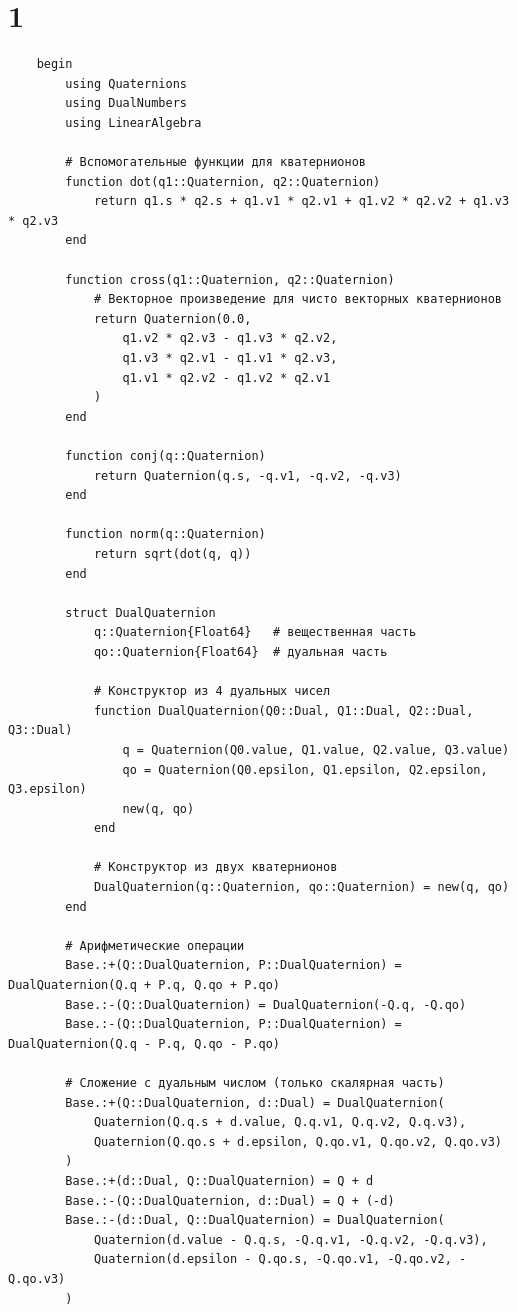\chapter{1}

\begin{verbatim}
    begin
        using Quaternions
        using DualNumbers
        using LinearAlgebra

        # Вспомогательные функции для кватернионов
        function dot(q1::Quaternion, q2::Quaternion)
            return q1.s * q2.s + q1.v1 * q2.v1 + q1.v2 * q2.v2 + q1.v3 * q2.v3
        end

        function cross(q1::Quaternion, q2::Quaternion)
            # Векторное произведение для чисто векторных кватернионов
            return Quaternion(0.0,
                q1.v2 * q2.v3 - q1.v3 * q2.v2,
                q1.v3 * q2.v1 - q1.v1 * q2.v3,
                q1.v1 * q2.v2 - q1.v2 * q2.v1
            )
        end

        function conj(q::Quaternion)
            return Quaternion(q.s, -q.v1, -q.v2, -q.v3)
        end

        function norm(q::Quaternion)
            return sqrt(dot(q, q))
        end

        struct DualQuaternion
            q::Quaternion{Float64}   # вещественная часть
            qo::Quaternion{Float64}  # дуальная часть

            # Конструктор из 4 дуальных чисел
            function DualQuaternion(Q0::Dual, Q1::Dual, Q2::Dual, Q3::Dual)
                q = Quaternion(Q0.value, Q1.value, Q2.value, Q3.value)
                qo = Quaternion(Q0.epsilon, Q1.epsilon, Q2.epsilon, Q3.epsilon)
                new(q, qo)
            end

            # Конструктор из двух кватернионов
            DualQuaternion(q::Quaternion, qo::Quaternion) = new(q, qo)
        end

        # Арифметические операции
        Base.:+(Q::DualQuaternion, P::DualQuaternion) = DualQuaternion(Q.q + P.q, Q.qo + P.qo)
        Base.:-(Q::DualQuaternion) = DualQuaternion(-Q.q, -Q.qo)
        Base.:-(Q::DualQuaternion, P::DualQuaternion) = DualQuaternion(Q.q - P.q, Q.qo - P.qo)

        # Сложение с дуальным числом (только скалярная часть)
        Base.:+(Q::DualQuaternion, d::Dual) = DualQuaternion(
            Quaternion(Q.q.s + d.value, Q.q.v1, Q.q.v2, Q.q.v3),
            Quaternion(Q.qo.s + d.epsilon, Q.qo.v1, Q.qo.v2, Q.qo.v3)
        )
        Base.:+(d::Dual, Q::DualQuaternion) = Q + d
        Base.:-(Q::DualQuaternion, d::Dual) = Q + (-d)
        Base.:-(d::Dual, Q::DualQuaternion) = DualQuaternion(
            Quaternion(d.value - Q.q.s, -Q.q.v1, -Q.q.v2, -Q.q.v3),
            Quaternion(d.epsilon - Q.qo.s, -Q.qo.v1, -Q.qo.v2, -Q.qo.v3)
        )


\end{verbatim}

